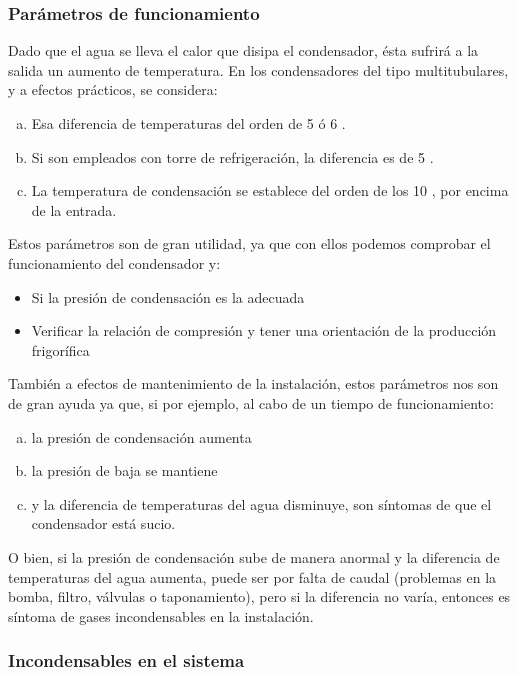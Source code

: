 \subsubsection{Par\'ametros de funcionamiento}

Dado que el agua se lleva el calor que disipa el condensador, \'esta sufrir\'a a la salida un aumento de temperatura. En los condensadores del tipo multitubulares, y a efectos pr\'acticos, se considera:
\begin{enumerate}[a.]
    \item Esa diferencia de temperaturas del orden de 5 \'o 6 \textcelsius.
    \item Si son empleados con torre de refrigeraci\'on, la diferencia es de 5 \textcelsius.
    \item La temperatura de condensaci\'on se establece del orden de los 10 \textcelsius, por encima de la entrada.
\end{enumerate}

Estos par\'ametros son de gran utilidad, ya que con ellos podemos comprobar el funcionamiento del condensador y:
\begin{itemize}
    \item Si la presi\'on de condensaci\'on es la adecuada
    \item Verificar la relaci\'on de compresi\'on y tener una orientaci\'on de la producci\'on frigor\'ifica
\end{itemize}
Tambi\'en a efectos de mantenimiento de la instalaci\'on, estos par\'ametros nos son de gran ayuda ya que, si por ejemplo, al cabo de un tiempo de funcionamiento:
\begin{enumerate}[a.]
    \item la presi\'on de condensaci\'on aumenta
    \item la presi\'on de baja se mantiene
    \item y la diferencia de temperaturas del agua disminuye, son s\'intomas de que el condensador est\'a sucio.
\end{enumerate}
O bien, si la presi\'on de condensaci\'on sube de manera anormal y la diferencia de temperaturas del agua aumenta, puede ser por falta de caudal (problemas en la bomba, filtro, v\'alvulas o taponamiento), pero si la diferencia no var\'ia, entonces es s\'intoma de gases incondensables en la instalaci\'on.

\subsubsection{Incondensables en el sistema}

